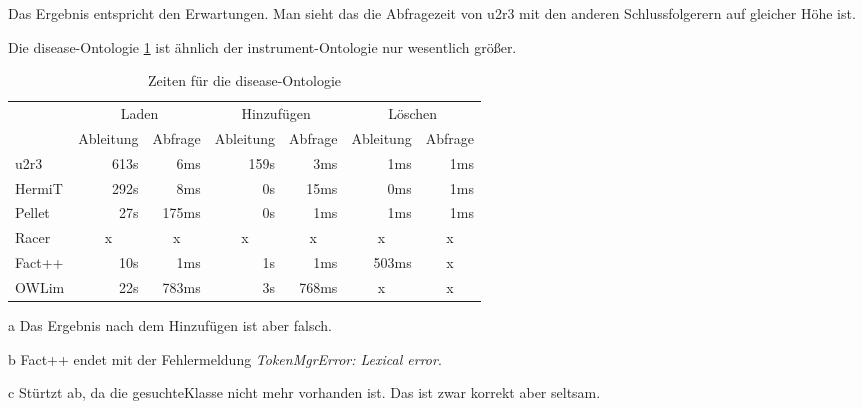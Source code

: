 Das Ergebnis entspricht den Erwartungen. Man sieht das die Abfragezeit von u2r3 mit den anderen Schlussfolgerern auf gleicher Höhe ist.

Die disease-Ontologie \ref{table-time-disease} ist ähnlich der instrument-Ontologie nur wesentlich größer.
\begin{table}[htbp]
\caption{Zeiten für die disease-Ontologie}
\label{table-time-disease}
\begin{center}
\begin{threeparttable}
\begin{tabular}{l|r|r|r|r|r|r|}
\cline{2-7}
 & \multicolumn{2}{|c|}{Laden} & \multicolumn{2}{|c|}{Hinzufügen} & \multicolumn{2}{|c|}{Löschen} \\
\cline{2-7}
 & \multicolumn{1}{|c|}{Ableitung} & \multicolumn{1}{|c|}{Abfrage} & \multicolumn{1}{|c|}{Ableitung} & \multicolumn{1}{|c|}{Abfrage} & \multicolumn{1}{|c|}{Ableitung} & \multicolumn{1}{|c|}{Abfrage} \\
\hline
\multicolumn{1}{|l|}{u2r3} & 613s & 6ms & 159s & 3ms & 1ms & 1ms \\ \hline
\multicolumn{1}{|l|}{HermiT\tnote{a}} & 292s & 8ms & 0s & 15ms & 0ms & 1ms \\ \hline
\multicolumn{1}{|l|}{Pellet\tnote{a}} & 27s & 175ms & 0s & 1ms & 1ms & 1ms \\ \hline
\multicolumn{1}{|l|}{Racer\tnote{b}} & \multicolumn{1}{c|}{x} & \multicolumn{1}{c|}{x} & \multicolumn{1}{c|}{x} & \multicolumn{1}{c|}{x} & \multicolumn{1}{c|}{x} & \multicolumn{1}{c|}{x} \\ \hline
\multicolumn{1}{|l|}{Fact++\tnote{c}} & 10s & 1ms & 1s & 1ms & 503ms & \multicolumn{1}{c|}{x} \\ \hline
\multicolumn{1}{|l|}{OWLim} & 22s & 783ms & 3s & 768ms & \multicolumn{1}{c|}{x} & \multicolumn{1}{c|}{x} \\ \hline
\end{tabular}
\begin{tablenotes}
	\item[a] Das Ergebnis nach dem Hinzufügen ist aber falsch.
	\item[b] Fact++ endet mit der Fehlermeldung \emph{TokenMgrError: Lexical error}.
	\item[c] Stürtzt ab, da die gesuchteKlasse nicht mehr vorhanden ist. Das ist zwar korrekt aber seltsam.
\end{tablenotes}
\end{threeparttable}
\end{center}
\end{table}

